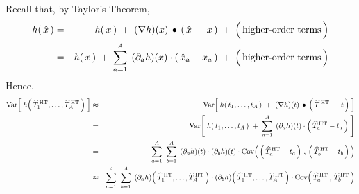 \vskip 0.5cm
\noindent
Recall that, by Taylor's Theorem,
\begin{eqnarray*}
h\!\left(\,\hat{x}\,\right)
&=&
	h\!\left(\,x\,\right)
	\; + \;
	(\nabla h)(x) \,\bullet\, \left(\,\hat{x} \,-\, x\,\right)
	\; + \;
	\left(\,\overset{{\color{white}.}}{\textnormal{higher-order terms}}\,\right)
\\
&=&
	h\!\left(\,x\,\right)
	\; + \;
	\overset{A}{\underset{a=1}{\sum}} \;\, (\partial_{a}h)(x) \cdot (\,\hat{x}_{a} - x_{a}\,)
	\; + \;
	\left(\,\overset{{\color{white}.}}{\textnormal{higher-order terms}}\,\right)
\end{eqnarray*}
Hence,
\begin{eqnarray*}
\Var\!\left[\;
	h\!\left(\,\widehat{T}^{\,\textnormal{HT}}_{1},\ldots,\widehat{T}^{\,\textnormal{HT}}_{A}\,\right)
	\;\right]
&\approx&
	\Var\!\left[\;
		\overset{{\color{white}.}}{h}\!\left(\,t_{1},\ldots,t_{A}\,\right)
		\; + \;
		(\nabla h)(t) \,\bullet\, \left(\,\widehat{T}^{\,\textnormal{HT}} \,-\, t\,\right)
		\;\right]
\\
&=&
	\Var\!\left[\;
		h\!\left(\,t_{1},\ldots,t_{A}\,\right)
		\; + \;
		\overset{A}{\underset{a=1}{\sum}} \;\,
			(\partial_{a}h)(t) \cdot \left(\,\widehat{T}^{\,\textnormal{HT}}_{a} - t_{a}\,\right)
		\;\right]
\\
&=&
	\overset{A}{\underset{a=1}{\sum}} \;\;
	\overset{A}{\underset{b=1}{\sum}} \;\,
	(\partial_{a}h)(t) \cdot (\partial_{b}h)(t) \cdot
	\Cov\!\left(\,
			\left(\,\widehat{T}^{\,\textnormal{HT}}_{a} - t_{a}\,\right)
			\,,\,
			\left(\,\widehat{T}^{\,\textnormal{HT}}_{b} - t_{b}\,\right)
		\,\right)
\\
&\approx&
	\overset{A}{\underset{a=1}{\sum}} \;\;
	\overset{A}{\underset{b=1}{\sum}} \;\,
	(\partial_{a}h)\!\left(\,\widehat{T}^{\,\textnormal{HT}}_{1},\ldots,\widehat{T}^{\,\textnormal{HT}}_{A}\,\right)
	\cdot
	(\partial_{b}h)\!\left(\,\widehat{T}^{\,\textnormal{HT}}_{1},\ldots,\widehat{T}^{\,\textnormal{HT}}_{A}\,\right)
	\cdot
	\Cov\!\left(\,
			\widehat{T}^{\,\textnormal{HT}}_{a}
			\,,\,
			\widehat{T}^{\,\textnormal{HT}}_{b}
		\,\right)
\end{eqnarray*}

